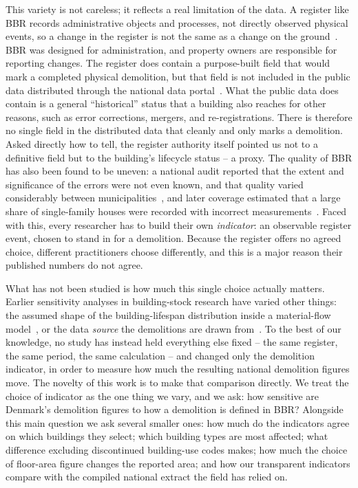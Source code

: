 This variety is not careless; it reflects a real limitation of the data. A
register like BBR records administrative objects and processes, not
directly observed physical events, so a change in the register is not the
same as a change on the ground~\cite{mit2021admindata,un2019registers}. BBR
was designed for administration, and property owners are responsible for
reporting changes. The register does contain a purpose-built field that
would mark a completed physical demolition, but that field is not included
in the public data distributed through the national data
portal~\cite{bbr_instruks,datafordeler_grunddatamodel}. What the public data
does contain is a general ``historical'' status that a building also reaches
for other reasons, such as error corrections, mergers, and
re-registrations. There is therefore no single field in the distributed
data that cleanly and only marks a demolition. Asked directly how to tell,
the register authority itself pointed us not to a definitive field but to
the building's lifecycle status -- a proxy. The quality of BBR has also
been found to be uneven: a national audit reported that the extent and
significance of the errors were not even known, and that quality varied
considerably between municipalities~\cite{rigsrevisionen_bbr}, and later
coverage estimated that a large share of single-family houses were recorded
with incorrect measurements~\cite{dr2023bbr}. Faced with this, every
researcher has to build their own \emph{indicator}: an observable register
event, chosen to stand in for a demolition. Because the register offers no
agreed choice, different practitioners choose differently, and this is a
major reason their published numbers do not agree.

What has not been studied is how much this single choice actually matters.
Earlier sensitivity analyses in building-stock research have varied other
things: the assumed shape of the building-lifespan distribution inside a
material-flow model~\cite{miatto2017buildinglifespan}, or the data
\emph{source} the demolitions are drawn from~\cite{huuhka2021stocks}. To the
best of our knowledge, no study has instead held everything else
fixed -- the same register, the same period, the same calculation -- and
changed only the demolition indicator, in order to measure how much the
resulting national demolition figures move. The novelty of this work is to
make that comparison directly. We treat the choice of indicator as the one
thing we vary, and we ask: how sensitive are Denmark's demolition figures to
how a demolition is defined in BBR? Alongside this main question we ask
several smaller ones: how much do the indicators agree on which buildings
they select; which building types are most affected; what difference excluding
discontinued building-use codes makes; how much the choice
of floor-area figure changes the reported area; and how our transparent
indicators compare with the compiled national extract the field has relied
on.

